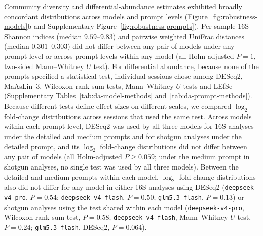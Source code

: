 \documentclass[10pt,letterpaper]{article}
\begin{document}
Community diversity and differential-abundance estimates exhibited broadly
concordant distributions across models and prompt levels (Figure~\ref{fig:robustness-models}b
and Supplementary Figure~\ref{fig:robustness-prompts}).
Per-sample 16S Shannon indices (median $9.59\text{--}9.83$) and pairwise
weighted UniFrac distances (median $0.301\text{--}0.303$) did not differ
between any pair of models under any prompt level or across prompt levels
within any model (all Holm-adjusted $P = 1$, two-sided Mann--Whitney $U$
test).  For differential abundance, because none of the prompts specified a
statistical test, individual sessions chose among DESeq2, MaAsLin~3,
Wilcoxon rank-sum tests, Mann--Whitney $U$ tests and LEfSe (Supplementary
Tables~\ref{tab:da-model-methods} and~\ref{tab:da-prompt-methods})\parencite{love2014deseq2,segata2011lefse}.  Because
different tests define effect sizes on different scales, we compared
$\log_2$ fold-change distributions across sessions that used the same test.
Across models within each prompt level, DESeq2 was used by all three models
for 16S analyses under the detailed and medium prompts and for shotgun
analyses under the detailed prompt, and its $\log_2$ fold-change
distributions did not differ between any pair of models (all Holm-adjusted
$P \ge 0.059$; under the medium prompt in shotgun analyses, no single test
was used by all three models).  Between the detailed and medium prompts
within each model, $\log_2$ fold-change distributions also did not differ for
any model in either 16S analyses using DESeq2 (\texttt{deepseek-v4-pro},
$P = 0.54$; \texttt{deepseek-v4-flash}, $P = 0.50$; \texttt{glm5.3-flash},
$P = 0.13$) or shotgun analyses using the test shared within each model
(\texttt{deepseek-v4-pro}, Wilcoxon rank-sum test, $P = 0.58$;
\texttt{deepseek-v4-flash}, Mann--Whitney $U$ test, $P = 0.24$;
\texttt{glm5.3-flash}, DESeq2, $P = 0.064$).
\end{document}
